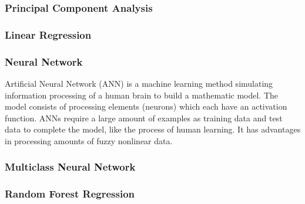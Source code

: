 \documentclass[titlepage]{article}
\begin{document}
\subsubsection*{Principal Component Analysis}
\subsubsection*{Linear Regression}
\subsubsection*{Neural Network}
Artificial Neural Network (ANN) is a machine learning method simulating information processing of a human brain to build a mathematic model. 
The model consists of processing elements (neurons) which each have an activation function. 
ANNs require a large amount of examples as training data and test data to complete the model, like the process of human learning. 
It has advantages in processing amounts of fuzzy nonlinear data.
\subsubsection*{Multiclass Neural Network}
\subsubsection*{Random Forest Regression}
\end{document}
